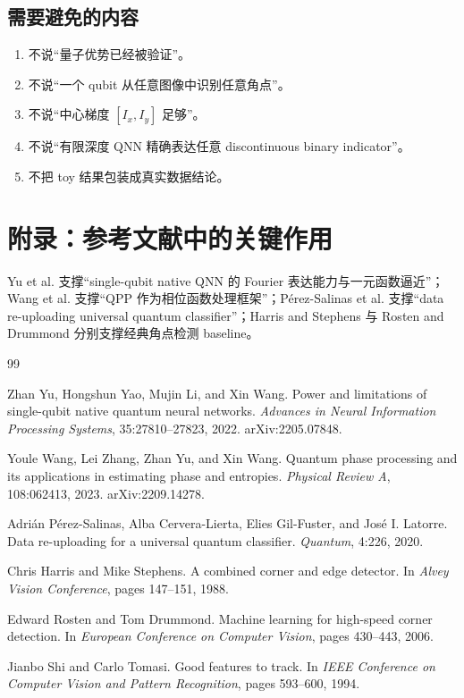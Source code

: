 \documentclass[UTF8,zihao=-4]{ctexart}
\begin{document}
\subsection{需要避免的内容}
\begin{enumerate}[leftmargin=2.0em]
    \item 不说“量子优势已经被验证”。
    \item 不说“一个 qubit 从任意图像中识别任意角点”。
    \item 不说“中心梯度 $[I_x,I_y]$ 足够”。
    \item 不说“有限深度 QNN 精确表达任意 discontinuous binary indicator”。
    \item 不把 toy 结果包装成真实数据结论。
\end{enumerate}

\section{附录：参考文献中的关键作用}

Yu et al. \cite{yu2022singlequbit} 支撑“single-qubit native QNN 的 Fourier 表达能力与一元函数逼近”；Wang et al. \cite{wang2023qpp} 支撑“QPP 作为相位函数处理框架”；P\'erez-Salinas et al. \cite{perezsalinas2020data} 支撑“data re-uploading universal quantum classifier”；Harris and Stephens \cite{harris1988combined} 与 Rosten and Drummond \cite{rosten2006fast} 分别支撑经典角点检测 baseline。

\begin{thebibliography}{99}

Zhan Yu, Hongshun Yao, Mujin Li, and Xin Wang.
\newblock Power and limitations of single-qubit native quantum neural networks.
\newblock \emph{Advances in Neural Information Processing Systems}, 35:27810--27823, 2022.
\newblock arXiv:2205.07848.

Youle Wang, Lei Zhang, Zhan Yu, and Xin Wang.
\newblock Quantum phase processing and its applications in estimating phase and entropies.
\newblock \emph{Physical Review A}, 108:062413, 2023.
\newblock arXiv:2209.14278.

Adri\'an P\'erez-Salinas, Alba Cervera-Lierta, Elies Gil-Fuster, and Jos\'e I. Latorre.
\newblock Data re-uploading for a universal quantum classifier.
\newblock \emph{Quantum}, 4:226, 2020.

Chris Harris and Mike Stephens.
\newblock A combined corner and edge detector.
\newblock In \emph{Alvey Vision Conference}, pages 147--151, 1988.

Edward Rosten and Tom Drummond.
\newblock Machine learning for high-speed corner detection.
\newblock In \emph{European Conference on Computer Vision}, pages 430--443, 2006.

Jianbo Shi and Carlo Tomasi.
\newblock Good features to track.
\newblock In \emph{IEEE Conference on Computer Vision and Pattern Recognition}, pages 593--600, 1994.

\end{thebibliography}
\end{document}
